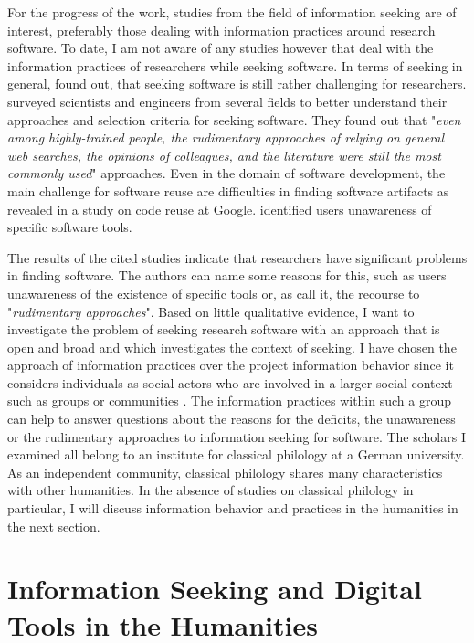 \documentclass[12pt, a4paper, titlepage, oneside, abstract=true, toc=listof, toc=bibliography, BCOR=1cm]{scrreprt}
\begin{document}
For the progress of the work, studies from the field of information seeking are of interest, preferably those dealing with information practices around research software.
To date, I am not aware of any studies however that deal with the information practices of researchers while seeking software. In terms of seeking in general, \citet{Howison2015} found out, that seeking software is still rather challenging for researchers. \citet{Hucka2018} surveyed scientists and engineers from several fields to better understand their approaches and selection criteria for seeking software. They found out that "\textit{even among highly-trained people, the rudimentary approaches of relying on general web searches, the opinions of colleagues, and the literature were still the most commonly used}" approaches. Even in the domain of software development, the main challenge for software reuse are difficulties in finding software artifacts as \citet{Bauer2014} revealed in a study on code reuse at Google. \citet{Grossman2009} identified users unawareness of specific software tools. 

The results of the cited studies indicate that researchers have significant problems in finding software. The authors can name some reasons for this, such as users unawareness of the existence of specific tools or, as \citep[p. 171]{Hucka2018} call it, the recourse to "\textit{rudimentary approaches}". Based on little qualitative evidence, I want to investigate the problem of seeking research software with an approach that is open and broad and which investigates the context of seeking. I have chosen the approach of information practices over the project information behavior since it considers individuals as social actors who are involved in a larger social context such as groups or communities \citep[p. 120]{Savolainen2007}. The information practices within such a group can help to answer questions about the reasons for the deficits, the unawareness or the rudimentary approaches to information seeking for software. The scholars I examined all belong to an institute for classical philology at a German university. As an independent community, classical philology shares many characteristics with other humanities. In the absence of studies on classical philology in particular, I will discuss information behavior and practices in the humanities in the next section.

\section{Information Seeking and Digital Tools in the Humanities}
\label{sec:Humanities}
\end{document}

